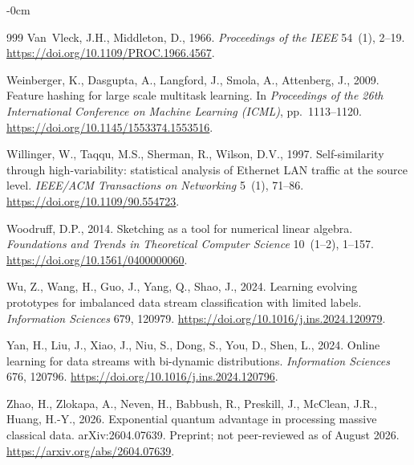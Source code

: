 \documentclass[sensors,article,submit,pdftex,moreauthors]{Definitions/mdpi}
\providecommand{\DIFadd}[1]{{\protect\color{blue}#1}} %
\providecommand{\DIFdel}[1]{} %
\providecommand{\DIFaddbegin}{} %
\providecommand{\DIFaddend}{} %
\providecommand{\DIFdelbegin}{} %
\providecommand{\DIFdelend}{} %
\begin{document}
\begin{adjustwidth}{-\extralength}{0cm}
\begin{thebibliography}{999}
\DIFaddbegin {}
\DIFadd{Van~Vleck, J.H., Middleton, D., 1966.
}\newblock \DIFadd{The spectrum of clipped noise.
}\newblock \emph{\DIFadd{Proceedings of the IEEE}} \DIFadd{54~(1), 2--19.
}\newblock \url{https://doi.org/10.1109/PROC.1966.4567}\DIFadd{.
}

\DIFaddend {}
Weinberger, K., Dasgupta, A., Langford, J., Smola, A., Attenberg, J., 2009.
\newblock Feature hashing for large scale multitask learning.
\newblock In \emph{Proceedings of the 26th International Conference on Machine Learning (ICML)}, pp.~1113--1120.
\newblock \url{https://doi.org/10.1145/1553374.1553516}.

Willinger, W., Taqqu, M.S., Sherman, R., Wilson, D.V., 1997.
\newblock Self-similarity through high-variability: statistical analysis of Ethernet LAN traffic at the source level.
\newblock \emph{IEEE/ACM Transactions on Networking} 5~(1), 71--86.
\newblock \url{https://doi.org/10.1109/90.554723}.

Woodruff, D.P., 2014.
\newblock Sketching as a tool for numerical linear algebra.
\newblock \emph{Foundations and Trends in Theoretical Computer Science} 10~(1--2), 1--157.
\newblock \url{https://doi.org/10.1561/0400000060}.

Wu, Z., Wang, H., Guo, J., Yang, Q., Shao, J., 2024.
\newblock Learning evolving prototypes for imbalanced data stream classification with limited labels.
\newblock \emph{Information Sciences} 679, 120979.
\newblock \url{https://doi.org/10.1016/j.ins.2024.120979}.

Yan, H., Liu, J., Xiao, J., Niu, S., Dong, S., You, D., Shen, L., 2024.
\newblock Online learning for data streams with bi-dynamic distributions.
\newblock \emph{Information Sciences} 676, 120796.
\newblock \url{https://doi.org/10.1016/j.ins.2024.120796}.

Zhao, H., Zlokapa, A., Neven, H., Babbush, R., Preskill, J., McClean, J.R., Huang, H.-Y., 2026.
\newblock Exponential quantum advantage in processing massive classical data.
\newblock arXiv:2604.07639. Preprint\DIFdelbegin \DIFdel{.
}\DIFdelend \DIFaddbegin \DIFadd{; not peer-reviewed as of August 2026.
}\DIFaddend \newblock \url{https://arxiv.org/abs/2604.07639}.

\end{thebibliography}
\end{adjustwidth}
\end{document}
